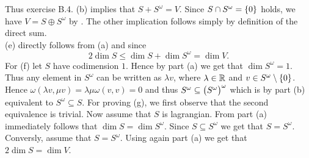 \begin{solution}
Thus exercise B.4. (b) \cite[620]{lee:smooth_manifolds:2013} implies that $S + S^\omega = V$. Since $S \cap S^\omega = \cbr[0]{0}$ holds, we have $V = S \oplus S^\omega$ by \cite[101]{fischer:lineare_algebra:2014}. The other implication follows simply by definition of the direct sum.\\
(e) directly follows from (a) and \cite[620]{lee:smooth_manifolds:2013} since
\begin{equation*}
2\dim S \leq \dim S + \dim S^\omega = \dim V.
\end{equation*}
For (f) let $S$ have codimension $1$. Hence by part (a) we get that $\dim S^\omega = 1$. Thus any element in $S^\omega$ can be written as $\lambda v$, where $\lambda \in \mathbb{R}$ and $v \in S^\omega \setminus \cbr[0]{0}$. Hence $\omega(\lambda v, \mu v) =  \lambda\mu \omega(v,v) = 0$ and thus $S^\omega \subseteq \del[1]{S^\omega}^\omega$ which is by part (b) equivalent to $S^\omega \subseteq S$. For proving (g), we first observe that the second equivalence is trivial. Now assume that $S$ is lagrangian. From part (a) immediately follows that $\dim S = \dim S^\omega$. Since $S \subseteq S^\omega$ we get that $S = S^\omega$. Conversly, assume that $S = S^\omega$. Using again part (a) we get that $2\dim S = \dim V$.
\end{solution}